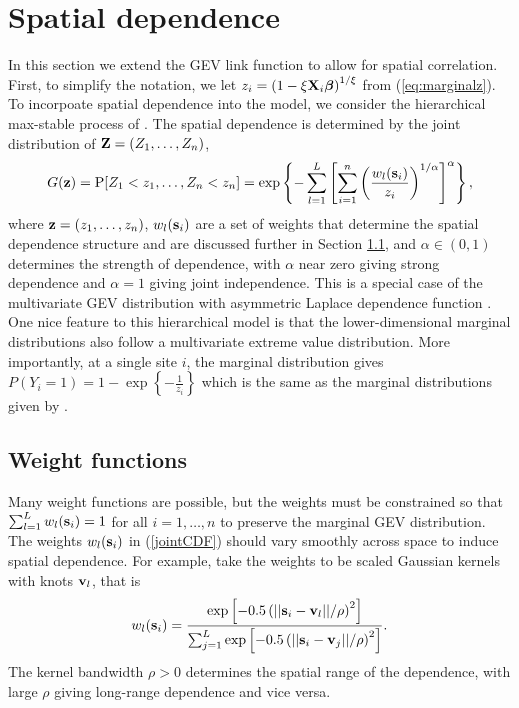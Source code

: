 \documentclass[11pt]{article}
\begin{document}
\section{Spatial dependence}\label{s:spatialdependence}
In this section we extend the GEV link function to allow for spatial correlation.
First, to simplify the notation, we let $z_i = \left(1 - \xi \mbox{\bf X}_i \mbox{\boldmath $\beta$} \right)^{1 / \xi}$ from (\ref{eq:marginalz}).
To incorpoate spatial dependence into the model, we consider the hierarchical max-stable process of \citet{Reich2012}.
The spatial dependence is determined by the joint distribution of $\mbox{\bf Z} = (Z_1,\ldots,Z_n)$,
\begin{align}\label{jointCDF}
 G(\mbox{\bf z}) =  \mbox{P}[Z_1<z_1,\ldots,Z_n<z_n] = \exp\left\{-\sum_{l=1}^L\left[\sum_{i=1}^n\left(\frac{w_{l}(\mbox{\bf s}_i)}{z_i}\right)^{1/\alpha}\right]^{\alpha}\right\},
\end{align}
where $\mbox{\bf z} = (z_1,\ldots,z_n)$, $w_{l}(\mbox{\bf s}_i)$ are a set of weights that determine the spatial dependence structure and are discussed further in Section \ref{s:weights}, and $\alpha\in(0,1)$ determines the strength of dependence, with $\alpha$ near zero giving strong dependence and $\alpha=1$ giving joint independence.
This is a special case of the multivariate GEV distribution with asymmetric Laplace dependence function \citep{Tawn1990}.
One nice feature to this hierarchical model is that the lower-dimensional marginal distributions also follow a multivariate extreme value distribution.
More importantly, at a single site $i$, the marginal distribution gives $P(Y_i = 1) = 1 - \exp\left\{ -\frac{ 1 }{ z_i} \right\}$ which is the same as the marginal distributions given by \citet{Wang2010}.

\subsection{Weight functions}\label{s:weights}
Many weight functions are possible, but the weights must be constrained so that $\sum_{l=1}^L w_{l}(\mbox{\bf s}_i)=1$ for all $i=1,\ldots,n$ to preserve the marginal GEV distribution.
The weights $w_{l}(\mbox{\bf s}_i)$ in (\ref{jointCDF}) should vary smoothly across space to induce spatial dependence.
For example, \cite{Reich2012} take the weights to be scaled Gaussian kernels with knots $\mbox{\bf v}_l$, that is
\begin{align}\label{w}
   w_{l}(\mbox{\bf s}_i) = \frac{\exp\left[-0.5\left(||\mbox{\bf s}_i-\mbox{\bf v}_l||/\rho\right)^2\right]}
                 {\sum_{j=1}^L\exp\left[-0.5\left(||\mbox{\bf s}_i-\mbox{\bf v}_j||/\rho\right)^2\right]}.
\end{align}
The kernel bandwidth $\rho>0$ determines the spatial range of the dependence, with large $\rho$ giving long-range dependence and vice versa.
\end{document}
